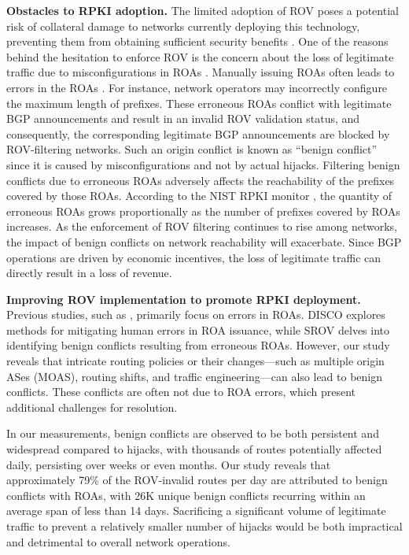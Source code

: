 \textbf{Obstacles to RPKI adoption.}
The limited adoption of ROV poses a potential risk of collateral damage to networks currently deploying this technology, preventing them from obtaining sufficient security benefits \cite{gilad2016we,hlavacek2020disco,morillo2021rov++,ixp:HlavacekSVW23}. %
One of the reasons behind the hesitation to enforce ROV is the concern about the loss of legitimate traffic due to misconfigurations in ROAs \cite{hlavacek2020disco,hlavacek2022smart}. Manually issuing ROAs often leads to errors in the ROAs \cite{hlavacek2020disco}. For instance, network operators may incorrectly configure the maximum length of prefixes. These erroneous ROAs conflict with legitimate BGP announcements and result in an invalid ROV validation status, and consequently, the corresponding legitimate BGP announcements are blocked by ROV-filtering networks.
Such an origin conflict is known as ``benign conflict'' since it is caused by misconfigurations and not by actual hijacks. Filtering benign conflicts due to erroneous ROAs adversely affects the reachability of the prefixes covered by those ROAs.
According to the NIST RPKI monitor \cite{nist2024}, the quantity of erroneous ROAs grows proportionally as the number of prefixes covered by ROAs increases.
As the enforcement of ROV filtering continues to rise among networks, the impact of benign conflicts on network reachability will exacerbate.
Since BGP operations are driven by economic incentives, the loss of legitimate traffic can directly result in a loss of revenue.

\textbf{Improving ROV implementation to promote RPKI deployment.}
Previous studies, such as \cite{hlavacek2020disco,hlavacek2022smart}, primarily focus on errors in ROAs.
DISCO \cite{hlavacek2020disco} explores methods for mitigating human errors in ROA issuance, while SROV \cite{hlavacek2022smart} delves into identifying benign conflicts resulting from erroneous ROAs. However, our study reveals that intricate routing policies or their changes—such as multiple origin ASes (MOAS), routing shifts, and traffic engineering—can also lead to benign conflicts. These conflicts are often not due to ROA errors, which present additional challenges for resolution.

In our measurements, benign conflicts are observed to be both persistent and widespread compared to hijacks, with thousands of routes potentially affected daily, persisting over weeks or even months.
Our study reveals that approximately 79\% of the ROV-invalid routes per day are attributed to benign conflicts with ROAs, with 26K unique benign conflicts recurring within an average span of less than 14 days. 
Sacrificing a significant volume of legitimate traffic to prevent a relatively smaller number of hijacks would be both impractical and detrimental to overall network operations.

